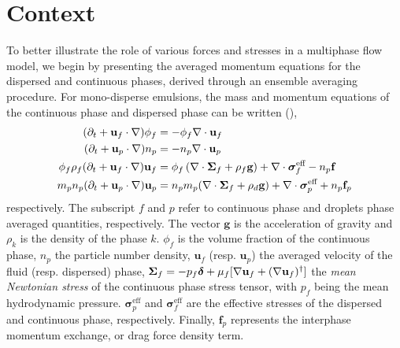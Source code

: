 \section{Context}

To better illustrate the role of various forces and stresses in a multiphase flow model, we begin by presenting the averaged momentum equations for the dispersed and continuous phases, derived through an ensemble averaging procedure.
For mono-disperse emulsions, the mass and momentum equations of the continuous phase and dispersed phase can be written \citep{fintzi2024averaged} (),
\begin{align}
    (\partial_t + \textbf{u}_f  \cdot \mathbf{\nabla}) \phi_f
    &= - \phi_f \mathbf{\nabla}\cdot \textbf{u}_f\\
    (\partial_t + \textbf{u}_p \cdot \mathbf{\nabla})n_p
    &=
    - n_p \mathbf{\nabla}\cdot \textbf{u}_p\\
    \phi_f \rho_f(\partial_t + \textbf{u}_f  \cdot \mathbf{\nabla}) \textbf{u}_f
    &= \phi_f 
    \left(\mathbf{\nabla}\cdot \bm{\Sigma}_f
    + \rho_f \textbf{g}\right)
    + \mathbf{\nabla}\cdot \bm\sigma_f^\text{eff}
    -n_p \textbf{f}\\
    m_pn_p (\partial_t + \textbf{u}_p \cdot \mathbf{\nabla})\textbf{u}_p
    &=
    n_pm_p(\mathbf{\nabla}\cdot \bm\Sigma_f
    + \rho_d  \textbf{g})
    + \mathbf{\nabla}\cdot \bm\sigma_p^\text{eff}
    + n_p\textbf{f}_p
    \\
\end{align}
respectively. 
The subscript $f$ and $p$ refer to continuous phase and droplets phase averaged quantities, respectively.
The vector $\textbf{g}$ is the acceleration of gravity and $\rho_k$ is the density of the phase $k$. 
$\phi_f$ is the volume fraction of the continuous phase, $n_p$ the particle number density, $\textbf{u}_f$ (resp. $\textbf{u}_p$) the averaged velocity of the fluid (resp. dispersed) phase, $\bm\Sigma_f = - p_f \bm\delta + \mu_f [\mathbf{\nabla} \textbf{u}_f +  (\mathbf{\nabla} \textbf{u}_f)^\dagger ]$ the \textit{mean Newtonian stress} of the continuous phase stress tensor, with $p_f$ being the mean hydrodynamic pressure.
$\bm{\sigma}^{\text{eff}}_p$ and $\bm{\sigma}^{\text{eff}}_f$ are the effective stresses of the dispersed and continuous phase, respectively.  
Finally, $\textbf{f}_p$ represents the interphase momentum exchange, or drag force density term. 

